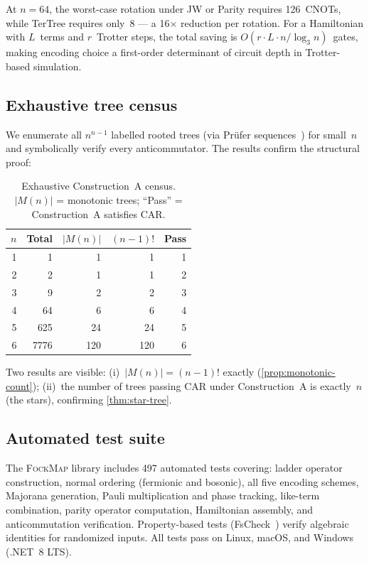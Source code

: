 At $n = 64$, the worst-case rotation under JW or Parity requires
126~CNOTs, while TerTree requires only~8 --- a 16$\times$ reduction
per rotation.  For a Hamiltonian with $L$~terms and $r$~Trotter
steps, the total saving is $O(r \cdot L \cdot n / \log_3 n)$~gates,
making encoding choice a first-order determinant of circuit depth in
Trotter-based simulation.

\subsection{Exhaustive tree census}
\label{sec:val-census}

We enumerate all $n^{n-1}$ labelled rooted trees (via Pr\"ufer
sequences~\cite{prufer1918}) for small~$n$ and symbolically verify every
anticommutator.  The results confirm the structural proof:

\begin{table}[t]
\centering
\caption{Exhaustive Construction~A census. $|M(n)|$ = monotonic
  trees; ``Pass'' = Construction~A satisfies CAR.}
\label{tab:census}
\begin{tabular}{@{}rrrrr@{}}
\toprule
$n$ & Total & $|M(n)|$ & $(n{-}1)!$ & Pass \\
\midrule
1 &       1 &     1 &     1 &  1 \\
2 &       2 &     1 &     1 &  2 \\
3 &       9 &     2 &     2 &  3 \\
4 &      64 &     6 &     6 &  4 \\
5 &     625 &    24 &    24 &  5 \\
6 &    7776 &   120 &   120 &  6 \\
\bottomrule
\end{tabular}
\end{table}

Two results are visible: (i)~$|M(n)| = (n{-}1)!$ exactly
(\cref{prop:monotonic-count}); (ii)~the number of trees passing CAR
under Construction~A is exactly~$n$ (the stars), confirming
\cref{thm:star-tree}.

\subsection{Automated test suite}
\label{sec:val-tests}

The \textsc{FockMap} library includes 497 automated tests covering:
ladder operator construction, normal ordering (fermionic and bosonic),
all five encoding schemes, Majorana generation, Pauli multiplication
and phase tracking, like-term combination, parity operator computation,
Hamiltonian assembly, and anticommutation verification.  Property-based
tests (FsCheck~\cite{fscheck}) verify algebraic identities for
randomized inputs.  All tests pass on Linux, macOS, and Windows
(.NET~8 LTS).
